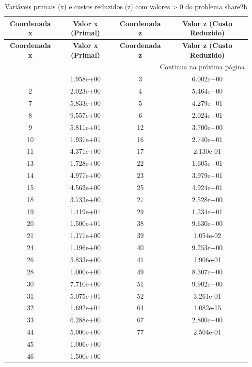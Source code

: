 \documentclass[12pt]{article}
\begin{document}
\begin{longtable}{@{}cccc@{}}
\caption{Variáveis primais (x) e custos reduzidos (z) com valores > 0 do problema share2b} \\
\toprule
\textbf{Coordenada x} & \textbf{Valor x (Primal)} & \textbf{Coordenada z} & \textbf{Valor z (Custo Reduzido)} \\
\midrule
\endfirsthead

\toprule
\textbf{Coordenada x} & \textbf{Valor x (Primal)} & \textbf{Coordenada z} & \textbf{Valor z (Custo Reduzido)} \\
\midrule
\endhead

\midrule \multicolumn{4}{r}{{Continua na próxima página}} \\ \midrule
\endfoot

\bottomrule
\endlastfoot
1 & 1.958e+00 & 3 & 6.002e+00 \\
2 & 2.023e+00 & 4 & 5.464e+00 \\
7 & 5.833e+00 & 5 & 4.279e+01 \\
8 & 9.557e+00 & 6 & 2.024e+01 \\
9 & 5.811e+01 & 12 & 3.700e+00 \\
10 & 1.937e+01 & 16 & 2.740e+01 \\
11 & 4.371e+00 & 17 & 2.130e-01 \\
13 & 1.728e+00 & 22 & 1.605e+01 \\
14 & 4.977e+00 & 23 & 3.979e+01 \\
15 & 4.562e+00 & 25 & 4.924e+01 \\
18 & 3.733e+00 & 27 & 2.528e+00 \\
19 & 1.419e+01 & 29 & 1.234e+01 \\
20 & 1.500e+01 & 38 & 9.630e+00 \\
21 & 1.177e+00 & 39 & 1.054e-02 \\
24 & 1.196e+00 & 40 & 9.253e+00 \\
26 & 5.833e+00 & 41 & 1.906e-01 \\
28 & 1.000e+00 & 49 & 8.307e+00 \\
30 & 7.710e+00 & 51 & 9.902e+00 \\
31 & 5.075e+01 & 52 & 3.261e-01 \\
32 & 1.692e+01 & 64 & 1.082e-15 \\
33 & 6.288e+00 & 67 & 2.800e+00 \\
44 & 5.000e+00 & 77 & 2.504e-01 \\
45 & 1.006e+00 &  &  \\
46 & 1.500e+00 &  &  \\

\end{longtable}
\end{document}
